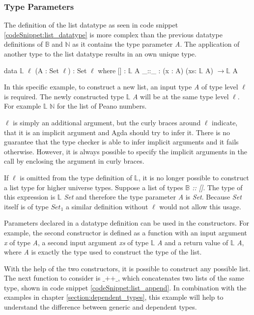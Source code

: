 \subsubsection{Type Parameters}
The definition of the list datatype as seen in code snippet \ref{codeSnippet:list_datatype} is more complex than the previous datatype definitions of $\mathbb{B}$ and $\mathbb{N}$ as it contains the type parameter \emph{A}.
The application of another type to the list datatype results in an own unique type.

\begin{codesnippet}[mathescape=true, caption={List datatype}, label={codeSnippet:list_datatype}]
data $\mathbb{L}$ {$\ell$} (A : Set $\ell$) : Set $\ell$ where
  [] : $\mathbb{L}$ A
  _::_ : (x : A) (xs: $\mathbb{L}$ A) $\rightarrow \mathbb{L}$ A
\end{codesnippet}

In this specific example, to construct a new list, an input type \emph{A} of type level $\ell$  is required.
The newly constructed type $\mathbb{L}$ \emph{A} will be at the same type level $\ell$.
For example $\mathbb{L}$ $\mathbb{N}$ for the list of Peano numbers.

$\ell$ is simply an additional argument, but the curly braces around $\ell$ indicate, that it is an implicit argument and Agda should try to infer it.
There is no guarantee that the type checker is able to infer implicit arguments and it fails otherwise.
However, it is always possible to specify the implicit arguments in the call by enclosing the argument in curly braces\cite{norell:deptyped}.

If $\ell$ is omitted from the type definition of $\mathbb{L}$, it is no longer possible to construct a list type for higher universe types.
Suppose a list of types \emph{$\mathbb{B}$ :: []}. 
The type of this expression is \emph{$\mathbb{L}$ Set} and therefore the type parameter \emph{A} is \emph{Set}. 
Because \emph{Set} itself is of type $Set_1$ a similar definition without $\ell$ would not allow this usage.

Parameters declared in a datatype definition can be used in the constructors.
For example, the second constructor is defined as a function with an input argument \emph{x} of type \emph{A}, a second input argument \emph{xs} of type $\mathbb{L}$ \emph{A} and a return value of $\mathbb{L}$ \emph{A}, where \emph{A} is exactly the type used to construct the type of the list.

With the help of the two constructors, it is possible to construct any possible list. 
The next function to consider is $\text{\_++\_}$, which concatenates two lists of the same type, shown in code snippet \ref{codeSnippet:list_append}. 
In combination with the examples in chapter \ref{section:dependent_types}, this example will help to understand the difference between generic and dependent types.

